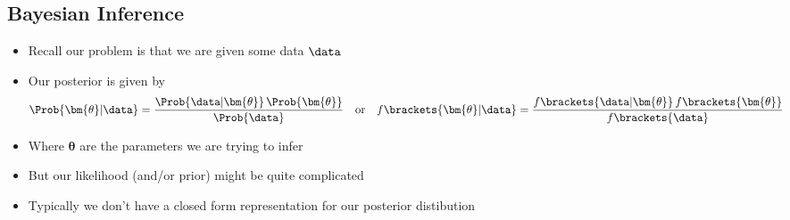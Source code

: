 
\begin{slide}
\section{Bayesian Inference}

\begin{PauseHighLight}
  \begin{itemize}
  \item Recall our problem is that we are given some data
    $\data$\pause
  \item Our posterior is given by
    \begin{align*}
      \Prob{\bm{\theta}|\data} &= \frac{\Prob{\data|\bm{\theta}} \,
                                 \Prob{\bm{\theta}}}{ \Prob{\data} } &
      &\text{or}&
      f\brackets{\bm{\theta}|\data} &= \frac{f\brackets{\data|\bm{\theta}} \,
                                 f\brackets{\bm{\theta}}}{ f\brackets{\data} }
    \end{align*}
  \item Where $\bm{\theta}$ are the parameters we are trying to infer\pause
  \item But our likelihood (and/or prior) might be quite
    complicated\pause
  \item Typically we don't have a closed form representation for our
    posterior distibution\pause
  \end{itemize}
\end{PauseHighLight}

\end{slide}




